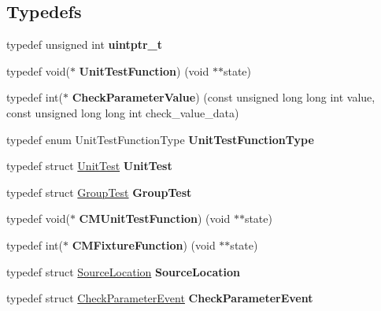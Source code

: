 \subsection*{Typedefs}
\begin{DoxyCompactItemize}
\item 
\mbox{\label{group__cmocka_ga728e973c799f206f0151c8a3bd1e5699}} 
typedef unsigned int {\bfseries uintptr\+\_\+t}
\item 
\mbox{\label{group__cmocka_ga44ac9dd4214cb04101b971f8ecd577c1}} 
typedef void($\ast$ {\bfseries Unit\+Test\+Function}) (void $\ast$$\ast$state)
\item 
\mbox{\label{group__cmocka_ga21c97369f4530d35df0ed58b6548a363}} 
typedef int($\ast$ {\bfseries Check\+Parameter\+Value}) (const unsigned long long int value, const unsigned long long int check\+\_\+value\+\_\+data)
\item 
\mbox{\label{group__cmocka_gaba6a9562a937ac55d75fd1cb115ea8e9}} 
typedef enum Unit\+Test\+Function\+Type {\bfseries Unit\+Test\+Function\+Type}
\item 
\mbox{\label{group__cmocka_gac462911e56a8682d519d6a8ca62ef8e3}} 
typedef struct \hyperlink{structUnitTest}{Unit\+Test} {\bfseries Unit\+Test}
\item 
\mbox{\label{group__cmocka_gaf09d9c26ec322bae18873ae226cf35a7}} 
typedef struct \hyperlink{structGroupTest}{Group\+Test} {\bfseries Group\+Test}
\item 
\mbox{\label{group__cmocka_gaf7ec001f0be4727694546526a804c18c}} 
typedef void($\ast$ {\bfseries C\+M\+Unit\+Test\+Function}) (void $\ast$$\ast$state)
\item 
\mbox{\label{group__cmocka_ga6d6219d951a8dd87760353943f045a25}} 
typedef int($\ast$ {\bfseries C\+M\+Fixture\+Function}) (void $\ast$$\ast$state)
\item 
\mbox{\label{group__cmocka_ga9e8b5db319cbf94adc883778f5a8a588}} 
typedef struct \hyperlink{structSourceLocation}{Source\+Location} {\bfseries Source\+Location}
\item 
\mbox{\label{group__cmocka_ga14bfa00817f21168192f0d4ce655d406}} 
typedef struct \hyperlink{structCheckParameterEvent}{Check\+Parameter\+Event} {\bfseries Check\+Parameter\+Event}
\end{DoxyCompactItemize}

